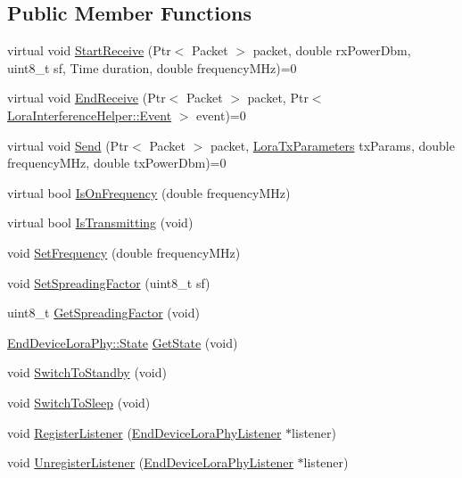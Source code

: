 \subsection*{Public Member Functions}
\begin{DoxyCompactItemize}
\item 
virtual void \hyperlink{classns3_1_1lorawan_1_1EndDeviceLoraPhy_a93fbde8325d792a8fc287201482f89cb}{Start\+Receive} (Ptr$<$ Packet $>$ packet, double rx\+Power\+Dbm, uint8\+\_\+t sf, Time duration, double frequency\+M\+Hz)=0
\item 
virtual void \hyperlink{classns3_1_1lorawan_1_1EndDeviceLoraPhy_af5618e5c03f0010244fcde7922d9899f}{End\+Receive} (Ptr$<$ Packet $>$ packet, Ptr$<$ \hyperlink{classns3_1_1lorawan_1_1LoraInterferenceHelper_1_1Event}{Lora\+Interference\+Helper\+::\+Event} $>$ event)=0
\item 
virtual void \hyperlink{classns3_1_1lorawan_1_1EndDeviceLoraPhy_a47136bcb9a933e69dbf0872fbd667610}{Send} (Ptr$<$ Packet $>$ packet, \hyperlink{structns3_1_1lorawan_1_1LoraTxParameters}{Lora\+Tx\+Parameters} tx\+Params, double frequency\+M\+Hz, double tx\+Power\+Dbm)=0
\item 
virtual bool \hyperlink{classns3_1_1lorawan_1_1EndDeviceLoraPhy_a70a83e7dde5b2ae33f6f47dbbf4ad0cd}{Is\+On\+Frequency} (double frequency\+M\+Hz)
\item 
virtual bool \hyperlink{classns3_1_1lorawan_1_1EndDeviceLoraPhy_a3925d5a27b7e1352c04a78f008071d23}{Is\+Transmitting} (void)
\item 
void \hyperlink{classns3_1_1lorawan_1_1EndDeviceLoraPhy_a269afea65f27650636abe200ac4c97b8}{Set\+Frequency} (double frequency\+M\+Hz)
\item 
void \hyperlink{classns3_1_1lorawan_1_1EndDeviceLoraPhy_abc5dd987f66030a3fee58bf03de45d99}{Set\+Spreading\+Factor} (uint8\+\_\+t sf)
\item 
uint8\+\_\+t \hyperlink{classns3_1_1lorawan_1_1EndDeviceLoraPhy_ac950e8d56611b64152d206a273957f6c}{Get\+Spreading\+Factor} (void)
\item 
\hyperlink{classns3_1_1lorawan_1_1EndDeviceLoraPhy_adc84e4ce7796e19f19f077df9592af15}{End\+Device\+Lora\+Phy\+::\+State} \hyperlink{classns3_1_1lorawan_1_1EndDeviceLoraPhy_ad7cb24138a7e9769aacb97aa2472feea}{Get\+State} (void)
\item 
void \hyperlink{classns3_1_1lorawan_1_1EndDeviceLoraPhy_a698d99b5ff4a82be7ecafbd6514db156}{Switch\+To\+Standby} (void)
\item 
void \hyperlink{classns3_1_1lorawan_1_1EndDeviceLoraPhy_aa439a56b019133278eb99751fd2287f6}{Switch\+To\+Sleep} (void)
\item 
void \hyperlink{classns3_1_1lorawan_1_1EndDeviceLoraPhy_a7e7c08dc5d7926c5210e121c3dd2bfe9}{Register\+Listener} (\hyperlink{classns3_1_1lorawan_1_1EndDeviceLoraPhyListener}{End\+Device\+Lora\+Phy\+Listener} $\ast$listener)
\item 
void \hyperlink{classns3_1_1lorawan_1_1EndDeviceLoraPhy_ad1291d05e67b2a00e792f171e7621f75}{Unregister\+Listener} (\hyperlink{classns3_1_1lorawan_1_1EndDeviceLoraPhyListener}{End\+Device\+Lora\+Phy\+Listener} $\ast$listener)
\end{DoxyCompactItemize}
